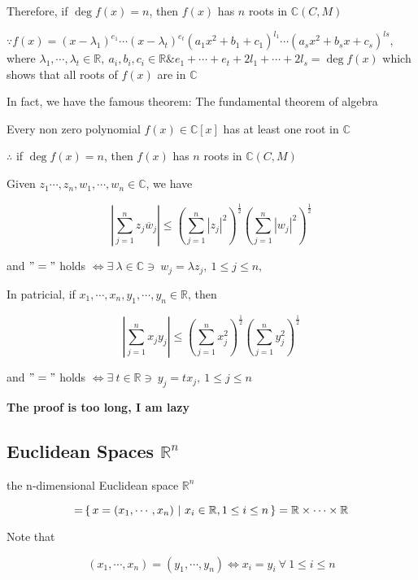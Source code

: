Therefore, if $\deg f(x) = n$, then $f(x)$ has $n$ roots in $\mathbb C (C,M)$
\begin{tcolorbox}
	$\because f(x) = (x-\lambda_1)^{e_1}\cdots(x-\lambda_t)^{e_t}(a_1x^2+b_1+c_1)^{l_1}\cdots(a_sx^2+b_sx+c_s)^{ls},$ where $\lambda_1,\cdots,\lambda_t \in \mathbb R,~a_i,b_i,c_i \in \mathbb R \& e_1+\cdots+e_t+2l_1+\cdots+2l_s = \deg f(x)$ which shows that all roots of $f(x)$ are in $\mathbb C$
	
	In fact, we have the famous theorem: The fundamental theorem of algebra
	
	Every non zero polynomial $f(x) \in \mathbb C[x]$ has at least one root in $\mathbb C$
	
	$\therefore$ if $\deg f(x) = n$, then $f(x)$ has $n$ roots in $\mathbb C (C,M)$
\end{tcolorbox}

\begin{thm*}
	Given $z_1\cdots,z_n,w_1,\cdots,w_n \in \mathbb C$, we have
	
	$$\left|\sum^n_{j=1}z_j\overline{w}_j\right| \leq \left(\sum^n_{j=1}|z_j|^2\right)^{\frac{1}{2}}\left(\sum^n_{j=1}|w_j|^2\right)^{\frac{1}{2}}$$
	
	and $"="$ holds $\Leftrightarrow \exists~\lambda \in \mathbb C \ni~ w_j = \lambda z_j,~1\leq j \leq n,$
	
	In patricial, if $x_1,\cdots,x_n,y_1,\cdots,y_n \in \mathbb R$, then
	
	$$\left|\sum^n_{j=1}x_jy_j\right| \leq \left( \sum^n_{j=1}x_j^2\right)^\frac{1}{2}\left(\sum^n_{j=1}y_j^2\right)^{\frac{1}{2}}$$
	
	and $"="$ holds $\Leftrightarrow \exists~t \in \mathbb R \ni~ y_j = tx_j,~1\leq j \leq n$
\end{thm*}

\textbf{\color{red}The proof is too long, I am lazy}

\newpage

\subsection{Euclidean Spaces $\mathbb R^n$}

\begin{defn}
	the n-dimensional Euclidean space $\mathbb R^n$
	
	$$\mathbb = \left\{ \,x = (x_1,\cdots,x_n)~|~x_i \in \mathbb R, 1\leq i \leq n \,\right\} = \mathbb R \times \cdots \times \mathbb R$$
	
	Note that
	
	$$(x_1,\cdots,x_n) = (y_1,\cdots,y_n) \Leftrightarrow x_i=y_i ~\forall~1\leq i \leq n$$
\end{defn}

